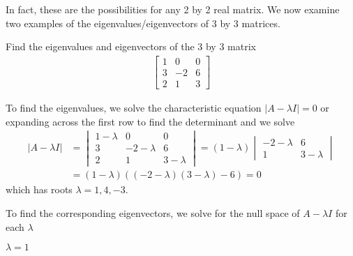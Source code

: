 In fact, these are the possibilities for any 2 by 2 real matrix.   We now examine two examples of the eigenvalues/eigenvectors of 3 by 3 matrices.  


\begin{example} \label{ex:eigs:3by3}
Find the eigenvalues and eigenvectors of the 3 by 3 matrix
%
\begin{align*}
\begin{bmatrix}
1 & 0 & 0 \\
3 & -2 & 6 \\
2 & 1 & 3
\end{bmatrix}
\end{align*}

\solution

To find the eigenvalues, we solve the characteristic equation $|A-\lambda I|=0$ or expanding across the first row to find the determinant and we solve
%
\begin{align*}
|A-\lambda I| &= \begin{vmatrix}
1-\lambda & 0 & 0 \\
3 & -2-\lambda & 6 \\
2 & 1 & 3-\lambda
\end{vmatrix} = (1-\lambda) \begin{vmatrix}
-2 - \lambda & 6 \\ 1 & 3-\lambda 
\end{vmatrix} \\
&=(1-\lambda)( (-2-\lambda)(3-\lambda) -6) =0
\end{align*} 
which has roots $\lambda=1,4,-3$.

To find the corresponding eigenvectors, we solve for the null space of $A-\lambda I$ for each $\lambda$
\begin{description}
\item[$\lambda=1$] 


\end{description}
\end{example}
